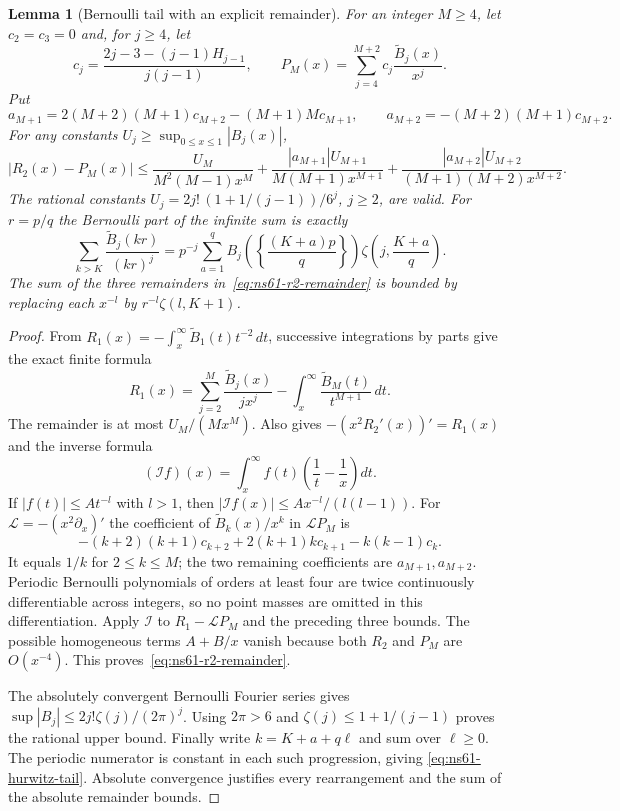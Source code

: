 \documentclass[11pt]{article}
\newtheorem{lemma}[theorem]{Lemma}
\theoremstyle{remark}
\begin{document}
\begin{lemma}[Bernoulli tail with an explicit remainder]
\label{lem:ns61-r2-tail}
For an integer $M\geq4$, let $c_2=c_3=0$ and, for $j\geq4$, let
\[
 c_j=\frac{2j-3-(j-1)H_{j-1}}{j(j-1)},\qquad
 P_M(x)=\sum_{j=4}^{M+2}c_j\frac{\widetilde B_j(x)}{x^j}.
\]
Put
\[
 a_{M+1}=2(M+2)(M+1)c_{M+2}-(M+1)Mc_{M+1},\qquad
 a_{M+2}=-(M+2)(M+1)c_{M+2}.
\]
For any constants $U_j\geq\sup_{0\leq x\leq1}|B_j(x)|$,
\begin{equation}
 |R_2(x)-P_M(x)|\leq
 \frac{U_M}{M^2(M-1)x^M}
 +\frac{|a_{M+1}|U_{M+1}}{M(M+1)x^{M+1}}
 +\frac{|a_{M+2}|U_{M+2}}{(M+1)(M+2)x^{M+2}}.
 \label{eq:ns61-r2-remainder}
\end{equation}
The rational constants
$U_j=2j!\,(1+1/(j-1))/6^j$, $j\geq2$, are valid.
For $r=p/q$ the Bernoulli part of the infinite sum is exactly
\begin{equation}
 \sum_{k>K}\frac{\widetilde B_j(kr)}{(kr)^j}
 =p^{-j}\sum_{a=1}^{q}
 B_j\left(\left\{\frac{(K+a)p}{q}\right\}\right)
 \zeta\left(j,\frac{K+a}{q}\right).
 \label{eq:ns61-hurwitz-tail}
\end{equation}
The sum of the three remainders in~\eqref{eq:ns61-r2-remainder}
is bounded by replacing each $x^{-l}$ by
$r^{-l}\zeta(l,K+1)$.
\end{lemma}
\begin{proof}
From $R_1(x)=-\int_x^\infty\widetilde B_1(t)t^{-2}\,dt$,
successive integrations by parts give the exact finite formula
\[
 R_1(x)=\sum_{j=2}^{M}\frac{\widetilde B_j(x)}{jx^j}
            -\int_x^\infty\frac{\widetilde B_M(t)}{t^{M+1}}\,dt.
\]
The remainder is at most $U_M/(Mx^M)$. Also
\cite[Proposition 5.2, Eq. (40)]{Ehm2024} gives
$-(x^2R_2'(x))'=R_1(x)$ and the inverse formula
\[
 (\mathcal If)(x)=\int_x^\infty f(t)\left(\frac1t-\frac1x\right)dt.
\]
If $|f(t)|\leq At^{-l}$ with $l>1$, then
$|\mathcal If(x)|\leq A x^{-l}/(l(l-1))$.
For $\mathcal L=-(x^2\partial_x)'$ the coefficient of
$\widetilde B_k(x)/x^k$ in $\mathcal LP_M$ is
\[
 -(k+2)(k+1)c_{k+2}+2(k+1)kc_{k+1}-k(k-1)c_k.
\]
It equals $1/k$ for $2\leq k\leq M$; the two remaining coefficients
are $a_{M+1},a_{M+2}$. Periodic Bernoulli polynomials of orders at
least four are twice continuously differentiable across integers, so
no point masses are omitted in this differentiation. Apply
$\mathcal I$ to $R_1-\mathcal LP_M$ and the preceding three bounds.
The possible homogeneous terms $A+B/x$ vanish because both $R_2$
and $P_M$ are $O(x^{-4})$. This proves~\eqref{eq:ns61-r2-remainder}.

The absolutely convergent Bernoulli Fourier series
\cite[Eq. (24.8.3)]{DLMFBernoulliFourier} gives
$\sup|B_j|\leq2j!\zeta(j)/(2\pi)^j$.
Using $2\pi>6$ and $\zeta(j)\leq1+1/(j-1)$ proves the rational
upper bound. Finally write $k=K+a+q\ell$ and sum over $\ell\geq0$.
The periodic numerator is constant in each such progression, giving
\eqref{eq:ns61-hurwitz-tail}. Absolute convergence justifies every
rearrangement and the sum of the absolute remainder bounds.
\end{proof}
\end{document}
